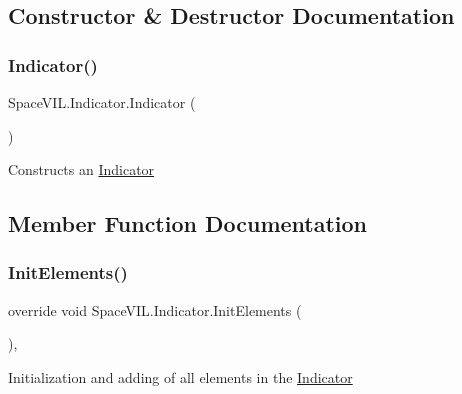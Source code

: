 \subsection{Constructor \& Destructor Documentation}
\mbox{\label{class_space_v_i_l_1_1_indicator_a2601a19d889e39b36100e015843001c8}} 
\subsubsection{\texorpdfstring{Indicator()}{Indicator()}}
{\footnotesize\ttfamily Space\+V\+I\+L.\+Indicator.\+Indicator (\begin{DoxyParamCaption}{ }\end{DoxyParamCaption})\hspace{0.3cm}{\ttfamily [inline]}}



Constructs an \mbox{\hyperlink{class_space_v_i_l_1_1_indicator}{Indicator}} 



\subsection{Member Function Documentation}
\mbox{\label{class_space_v_i_l_1_1_indicator_a787de3f581ef112a306781a4a9722fb5}} 
\subsubsection{\texorpdfstring{Init\+Elements()}{InitElements()}}
{\footnotesize\ttfamily override void Space\+V\+I\+L.\+Indicator.\+Init\+Elements (\begin{DoxyParamCaption}{ }\end{DoxyParamCaption})\hspace{0.3cm}{\ttfamily [inline]}, {\ttfamily [virtual]}}



Initialization and adding of all elements in the \mbox{\hyperlink{class_space_v_i_l_1_1_indicator}{Indicator}} 




